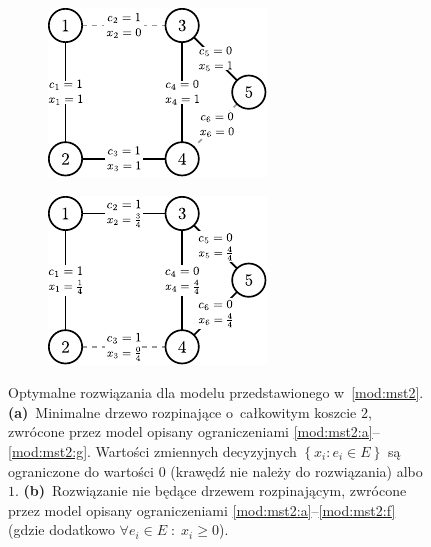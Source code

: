 \begin{figure}[!h]
	\null\hfill
	\begin{subfigure}[b]{0.27\textwidth}
		\includegraphics[width=\textwidth]{Chapter_III/MST3-example/a}
		\caption{}
		\label{fig:mst3Example:a}
	\end{subfigure}
	\hfill
	\begin{subfigure}[b]{0.27\textwidth}
		\includegraphics[width=\textwidth]{Chapter_III/MST3-example/b}
		\caption{}
		\label{fig:mst3Example:b}
	\end{subfigure}
	\hfill\null
	\caption{
		Optymalne rozwiązania dla modelu przedstawionego w~\ref{mod:mst2}.
		\textbf{(a)}~Minimalne drzewo rozpinające o~całkowitym koszcie $2$, zwrócone przez model opisany ograniczeniami \ref{mod:mst2:a}--\ref{mod:mst2:g}.
		Wartości zmiennych decyzyjnych $\left\{ x_{i} : e_{i} \in E \right\}$ są ograniczone do wartości $0$ (krawędź nie należy do rozwiązania) albo $1$.
		\textbf{(b)}~Rozwiązanie nie będące drzewem rozpinającym, zwrócone przez model opisany ograniczeniami \ref{mod:mst2:a}--\ref{mod:mst2:f} (gdzie dodatkowo $\forall e_{i} \in E \; : \; x_{i} \geqslant 0$).
	}
	\label{fig:mst3Example}
\end{figure}


